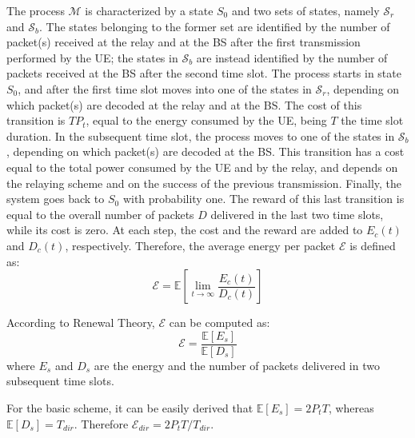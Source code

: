 \documentclass[12pt, letterpaper, onecolumn, draftcls]{IEEEtran}
\begin{document}
The process $\mathcal{M}$ is characterized by a state $S_0$ and two sets of states, namely $\mathcal{S}_r$ and $\mathcal{S}_b$. The states belonging to the former set are identified by the number of packet(s) received at the relay and at the BS after the first transmission performed by the UE; the states in $\mathcal{S}_b$ are instead identified by the number of packets received at the BS after the second time slot.
The process starts in state $S_0$, and after the first time slot moves into one of the states in $\mathcal{S}_r$, depending on which packet(s) are decoded at the relay and at the BS. The cost of this transition is $TP_t$, equal to the energy consumed by the UE, being $T$ the time slot duration.
In the subsequent time slot, the process moves to one of the states in $\mathcal{S}_b$, depending on which packet(s) are decoded at the BS. This transition has a cost equal to the total power consumed by the UE and by the relay, and depends on the relaying scheme and on the success of the previous transmission.
Finally, the system goes back to $S_0$ with probability one. The reward of this last transition is equal to the overall number of packets $D$ delivered in the last two time slots, while its cost is zero.
At each step, the cost and the reward are added to $E_c(t)$ and $D_c(t)$, respectively.
Therefore, the average energy per packet $\mathcal{E}$ is defined as:
\begin{equation}
 \mathcal{E} = \mathbb{E}\left[\lim_{t\rightarrow\infty}\frac{E_c(t)}{D_c(t)}\right]
\end{equation}

According to Renewal Theory, $\mathcal{E}$ can be computed as:
\begin{equation}
 \mathcal{E} = \frac{\mathbb{E}\left[E_s\right]}{\mathbb{E}\left[D_s\right]}
\end{equation}
where $E_s$ and $D_s$ are the energy and the number of packets delivered in two subsequent time slots.

For the basic scheme, it can be easily derived that $\mathbb{E}\left[E_s\right] = 2P_tT$, whereas $\mathbb{E}\left[D_s\right] = T_{dir}$. Therefore $\mathcal{E}_{dir} = 2P_tT/T_{dir}$.
\end{document}
